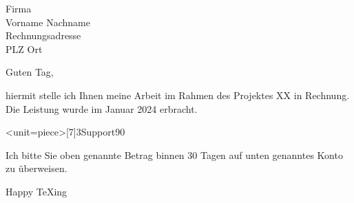\documentclass[parskip=half-,german]{scrartcl}
\begin{document}
\begin{letter}{Firma\\Vorname Nachname\\Rechnungsadresse\\PLZ Ort}
	
\opening{Guten Tag,}

hiermit stelle ich Ihnen meine Arbeit im Rahmen des Projektes XX in Rechnung. Die Leistung wurde im Januar 2024 erbracht. 

\AddInvoiceItem<unit=piece>[7]{3}{Support}{90}

\PrintInvoiceTabular

Ich bitte Sie oben genannte Betrag binnen 30 Tagen auf unten genanntes Konto zu überweisen.

\closing{Happy \TeX{}ing}


\end{letter}
\end{document}
